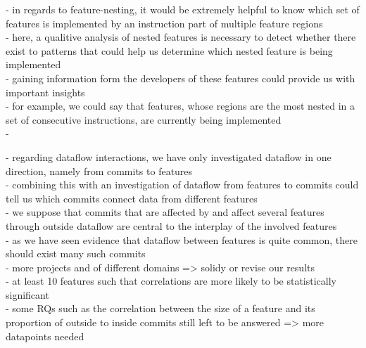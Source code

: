 - in regards to feature-nesting, it would be extremely helpful to know which set of features is implemented by an instruction part of multiple feature regions \\
- here, a qualitive analysis of nested features is necessary to detect whether there exist to patterns that could help us determine which nested feature is being implemented \\
- gaining information form the developers of these features could provide us with important insights \\
- for example, we could say that features, whose regions are the most nested in a set of consecutive instructions, are currently being implemented \\
-

- regarding dataflow interactions, we have only investigated dataflow in one direction, namely from commits to features \\
- combining this with an investigation of dataflow from features to commits could tell us which commits connect data from different features \\
- we suppose that commits that are affected by and affect several features through outside dataflow are central to the interplay of the involved features \\
- as we have seen evidence that dataflow between features is quite common, there should exist many such commits \\

- more projects and of different domains => solidy or revise our results \\
- at least 10 features such that correlations are more likely to be statistically significant \\
- some RQs such as the correlation between the size of a feature and its proportion of outside to inside commits still left to be answered => more datapoints needed \\
\fi

